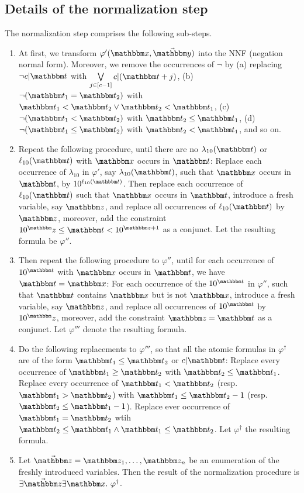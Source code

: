 

\subsection{Details of the normalization step}\label{app-norm}
%
The normalization step comprises the following sub-steps.
\begin{enumerate}
\item At first, we transform $\varphi'(\ivarx,\vec{\ivary})$ into the NNF (negation normal form). Moreover, we remove the occurrences of $\neg$ by (a) replacing $\neg c | \iterm$ with $\bigvee \limits_{j \in [c-1]} c | (\iterm+j)$, (b)  $\neg (\iterm_1 = \iterm_2)$ with $\iterm_1 < \iterm_2 \vee \iterm_2 < \iterm_1$, (c) $\neg (\iterm_1 < \iterm_2)$ with $\iterm_2 \le \iterm_1$, (d) $\neg (\iterm_1 \le \iterm_2)$ with $\iterm_2 < \iterm_1$, and so on.
%
\item Repeat the following procedure, until there are no $\lambda_{10}(\iterm)$ or $\ell_{10}(\iterm)$ with $\ivarx$ occurs in $\iterm$: Replace each occurrence of $\lambda_{10}$ in $\varphi'$, say $\lambda_{10}(\iterm)$, such that $\ivarx$ occurs in $\iterm$, by $10^{\ell_{10}(\iterm)}$. Then replace each occurrence of $\ell_{10}(\iterm)$ such that $\ivarx$ occurs in $\iterm$, introduce a fresh variable, say $\ivarz$, and replace all occurrences of $\ell_{10}(\iterm)$ by $\ivarz$, moreover, add the constraint $10^\ivarz \le \iterm < 10^{\ivarz + 1}$ as a conjunct. Let the resulting formula be $\varphi''$.
%

\item Then repeat the following procedure to $\varphi''$, until for each occurrence of $10^{\iterm}$ with $\ivarx$ occurs in $\iterm$, we have $\iterm = \ivarx$: For each occurrence of the $10^{\iterm}$ in $\varphi''$, such that $\iterm$ contains $\ivarx$ but is not $\ivarx$, introduce a fresh variable, say $\ivarz$, and replace all occurrences of $10^{\iterm}$ by $10^\ivarz$, moreover, add the constraint $\ivarz = \iterm$ as a conjunct. Let $\varphi'''$ denote the resulting formula.  

\item Do the following replacements to $\varphi'''$, so that all the atomic formulas in $\varphi^\dag$ are of the form $\iterm_1 \le \iterm_2$ or $c | \iterm$: Replace every occurrence of $\iterm_1 \ge \iterm_2$ with $\iterm_2 \le \iterm_1$. Replace every occurrence of $\iterm_1 < \iterm_2$ (resp. $\iterm_1 > \iterm_2$) with $\iterm_1 \le \iterm_2 - 1$ (resp. $\iterm_2 \le \iterm_1-1$). Replace ever occurrence of $\iterm_1 = \iterm_2$ wtih $\iterm_2 \le \iterm_1 \wedge \iterm_1 \le \iterm_2$. Let $\varphi^\dag$ the resulting formula. 
%
\item Let $\vec{\ivarz} = \ivarz_1,\ldots, \ivarz_n$ be an enumeration of the freshly introduced variables. Then the result of the normalization procedure is 
$\exists \vec{\ivarz}\exists \ivarx.\ \varphi^\dag$.
\end{enumerate}


